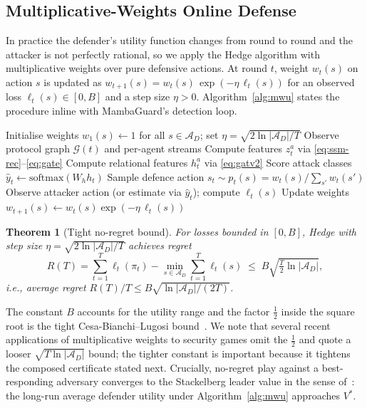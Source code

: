 \documentclass[journal,10pt,twocolumn]{IEEEtran}
\newtheorem{theorem}{Theorem}
\newcommand{\calA}{\mathcal{A}}
\newcommand{\calG}{\mathcal{G}}
\begin{document}
\subsection{Multiplicative-Weights Online Defense}
\label{sec:noregret}
In practice the defender's utility function changes from round to round and the attacker is not perfectly rational, so we apply the Hedge algorithm with multiplicative weights over pure defensive actions. At round $t$, weight $w_{t}(s)$ on action $s$ is updated as $w_{t+1}(s)=w_{t}(s)\,\exp(-\eta\,\ell_{t}(s))$ for an observed loss $\ell_{t}(s)\in[0,B]$ and a step size $\eta>0$. Algorithm~\ref{alg:mwu} states the procedure inline with MambaGuard's detection loop.

\begin{algorithm}[t]
\caption{MambaGuard online defence loop}
\label{alg:mwu}
\begin{algorithmic}[1]
\STATE Initialise weights $w_{1}(s)\!\leftarrow\!1$ for all $s\!\in\!\calA_{D}$; set $\eta=\sqrt{2\ln|\calA_{D}|/T}$
  \STATE Observe protocol graph $\calG(t)$ and per-agent streams
  \STATE Compute features $z^{a}_{t}$ via \eqref{eq:ssm-rec}--\eqref{eq:gate}
  \STATE Compute relational features $h^{a}_{t}$ via \eqref{eq:gatv2}
  \STATE Score attack classes $\hat y_{t}\!\leftarrow\!\mathrm{softmax}(W_{h} h_{t})$
  \STATE Sample defence action $s_{t}\!\sim\!p_{t}(s)\!=\!w_{t}(s)/\sum_{s'} w_{t}(s')$
  \STATE Observe attacker action (or estimate via $\hat y_{t}$); compute $\ell_{t}(s)$
  \STATE Update weights $w_{t+1}(s)\!\leftarrow\!w_{t}(s)\exp(-\eta\,\ell_{t}(s))$
\ENDFOR
\end{algorithmic}
\end{algorithm}

\begin{theorem}[Tight no-regret bound]
\label{thm:regret}
For losses bounded in $[0,B]$, Hedge with step size $\eta=\sqrt{2\ln|\calA_{D}|/T}$ achieves regret
\begin{equation}
R(T) = \sum_{t=1}^{T}\ell_{t}(\pi_{t})-\min_{s\in\calA_{D}}\sum_{t=1}^{T}\ell_{t}(s) \;\le\; B\sqrt{\tfrac{T}{2}\ln|\calA_{D}|},
\label{eq:regret}
\end{equation}
i.e., average regret $R(T)/T\le B\sqrt{\ln|\calA_{D}|/(2T)}$.
\end{theorem}

The constant $B$ accounts for the utility range and the factor $\tfrac{1}{2}$ inside the square root is the tight Cesa-Bianchi--Lugosi bound~\cite{CesaBianchi2006Prediction,Arora2012MWU}. We note that several recent applications of multiplicative weights to security games omit the $\tfrac{1}{2}$ and quote a looser $\sqrt{T\ln|\calA_{D}|}$ bound; the tighter constant is important because it tightens the composed certificate stated next. Crucially, no-regret play against a best-responding adversary converges to the Stackelberg leader value in the sense of~\cite{Balcan2015Commitment}: the long-run average defender utility under Algorithm~\ref{alg:mwu} approaches $V^{*}$.
\end{document}
